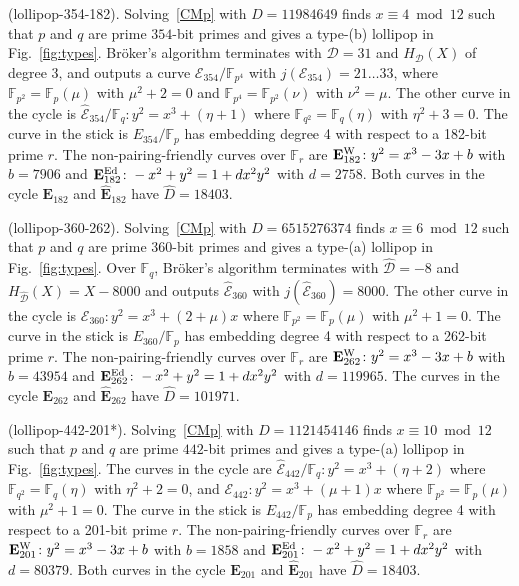 \documentclass[version=preprint]{iacrcc}
\newcommand{\F}{\mathbb{F}}
\newcommand{\EC}{\mathcal{E}}
\newcommand{\D}{\mathcal{D}}
\begin{document}
\begin{example}(\textsf{lollipop-354-182}). \label{example:354-182} 
Solving~\eqref{CMp} with $D=11984649$ finds $x \equiv 4 \bmod{12}$ such that $p$ and $q$ are prime $354$-bit primes and gives a type-(b) lollipop in Fig.~\ref{fig:types}. Br{\"o}ker's algorithm terminates with $\D=31$ and $H_\D(X)$ of degree 3, and outputs a curve ${\EC}_{354}/\F_{p^4}$ with $j({\EC}_{354})=21 \dots 33$, where $\F_{p^2}=\F_p(\mu)$ with $\mu^2+2=0$ and $\F_{p^4}=\F_{p^2}(\nu)$ with $\nu^2=\mu$. The other curve in the cycle is $\hat{\EC}_{354}/\F_q \colon y^2=x^3+(\eta+1)$ where  $\F_{q^2}=\F_q(\eta)$ with $\eta^2+3=0$. The curve in the stick is $E_{354}/\F_p$ has embedding degree 4 with respect to a 182-bit prime $r$. The non-pairing-friendly curves over $\F_r$ are $\mathbf{E}_{182}^{\rm W} \colon y^2=x^3-3x+b$ with $b=7906$ and $\mathbf{E}_{182}^{\rm Ed} \colon -x^2+y^2=1+dx^2y^2$ with $d=2758$. Both curves in the cycle $\mathbf{E}_{182}$ and $\hat{\mathbf{E}}_{182}$ have $\hat{D}=18403$. 
\end{example}

\begin{example}(\textsf{lollipop-360-262}). \label{example:360-262} Solving~\eqref{CMp} with $D=6515276374$ finds $x \equiv 6 \bmod{12}$ such that $p$ and $q$ are prime $360$-bit primes and gives a type-(a) lollipop in Fig.~\ref{fig:types}. Over $\F_q$, Br{\"o}ker's algorithm terminates with $\hat{\D}=-8$ and $H_{\hat{\D}}(X)= X -8000$ and outputs $\hat{\EC}_{360}$ with $j(\hat{\EC}_{360}) =8000$. The other curve in the cycle is ${\EC}_{360} \colon y^2=x^3+(2+\mu)x$  where $\F_{p^2}=\F_p(\mu)$ with $\mu^2+1=0$. The curve in the stick is $E_{360}/\F_p$ has embedding degree 4 with respect to a 262-bit prime $r$. The non-pairing-friendly curves over $\F_r$ are $\mathbf{E}_{262}^{\rm W} \colon y^2=x^3-3x+b$ with $b=43954$ and $\mathbf{E}_{262}^{\rm Ed} \colon -x^2+y^2=1+dx^2y^2$ with $d=119965$. The curves in the cycle $\mathbf{E}_{262}$ and $\hat{\mathbf{E}}_{262}$ have $\hat{D}=101971$. 
\end{example}

\begin{example}(\textsf{lollipop-442-201}*). \label{example:442-201} Solving~\eqref{CMp} with $D=1121454146$ finds $x \equiv 10 \bmod{12}$ such that $p$ and $q$ are prime $442$-bit primes and gives a type-(a) lollipop in Fig.~\ref{fig:types}. The curves in the cycle are $\hat{\EC}_{442}/\F_q \colon y^2=x^3+(\eta+2)$ where  $\F_{q^2}=\F_q(\eta)$ with $\eta^2+2=0$, and ${\EC}_{442} \colon y^2=x^3+(\mu+1)x$ where $\F_{p^2}=\F_p(\mu)$ with $\mu^2+1=0$. The curve in the stick is $E_{442}/\F_p$ has embedding degree 4 with respect to a 201-bit prime $r$. The non-pairing-friendly curves over $\F_r$ are $\mathbf{E}_{201}^{\rm W} \colon y^2=x^3-3x+b$ with $b=1858$ and $\mathbf{E}_{201}^{\rm Ed} \colon -x^2+y^2=1+dx^2y^2$ with $d=80379$. Both curves in the cycle $\mathbf{E}_{201}$ and $\hat{\mathbf{E}}_{201}$ have $\hat{D}=18403$. 
\end{example}
\end{document}
